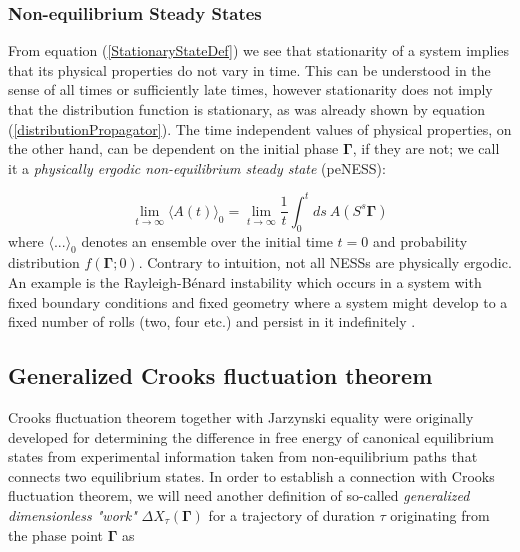\documentclass[a4paper,12pt]{article}
\begin{document}
\subsubsection{Non-equilibrium Steady States}

From equation (\ref{StationaryStateDef}) we see that stationarity of a system implies that its physical properties do not vary in time. This can be understood in the sense of all times or sufficiently late times, however stationarity does not imply that the distribution function is stationary, as was already shown by equation (\ref{distributionPropagator}).
The time independent values of physical properties, on the other hand, can be dependent on the initial phase $\bm{\Gamma}$, if they are not; we call it a \textit{physically ergodic non-equilibrium steady state} (peNESS):

\begin{equation}
      \lim_{t \to \infty} \langle A(t) \rangle_0 = \lim_{t \to \infty} \frac{1}{t} \int_0^t ds\ A(S^s \bm{\Gamma})
\end{equation}
 where $\langle ... \rangle_0$ denotes an ensemble over the initial time $t=0$ and probability distribution $f(\bm{\Gamma};0)$.
Contrary to intuition, not all NESSs are physically ergodic. An example is the Rayleigh-Bénard instability which occurs in a system with fixed boundary conditions and fixed geometry where a system might develop to a fixed number of rolls (two, four etc.) and persist in it indefinitely \cite{Evans:2241458}.
\subsection{Generalized Crooks fluctuation theorem}

Crooks fluctuation theorem together with Jarzynski equality were originally developed for determining the difference in free energy of canonical equilibrium states from experimental information taken from non-equilibrium paths that connects two equilibrium states. 
In order to establish a connection with Crooks fluctuation theorem, we will need another definition of so-called \textit{generalized dimensionless "work"} $\Delta X_{\tau}(\bm{\Gamma})$ for a trajectory of duration $\tau$ originating from the phase point $\bm{\Gamma}$ as
\end{document}
